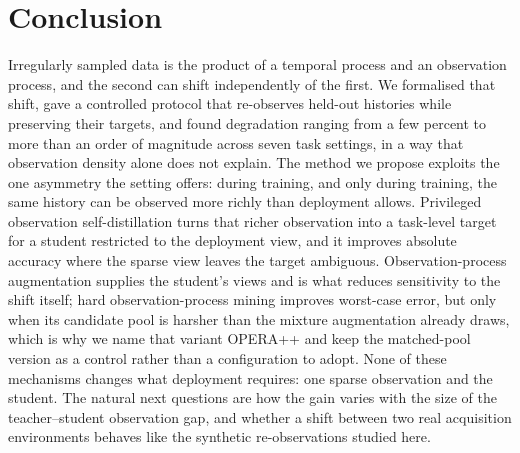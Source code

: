 
\section{Conclusion}
Irregularly sampled data is the product of a temporal process and an observation process, and the second can shift
independently of the first. We formalised that shift, gave a controlled protocol that re-observes held-out
histories while preserving their targets, and found degradation ranging from a few percent to more than an order of
magnitude across seven task settings, in a way that observation density alone does not explain. The method we
propose exploits the one asymmetry the setting offers: during training, and only during training, the same history
can be observed more richly than deployment allows. Privileged observation self-distillation turns that richer
observation into a task-level target for a student restricted to the deployment view, and it improves absolute
accuracy where the sparse view leaves the target ambiguous. Observation-process augmentation supplies the student's
views and is what reduces sensitivity to the shift itself; hard observation-process mining improves worst-case
error, but only when its candidate pool is harsher than the mixture augmentation already draws, which is why we
name that variant OPERA++ and keep the matched-pool version as a control rather than a configuration to adopt.
None of these mechanisms changes what deployment requires:
one sparse observation and the student. The natural next questions are how the gain varies with the size of the
teacher--student observation gap, and whether a shift between two real acquisition environments behaves like the
synthetic re-observations studied here.
